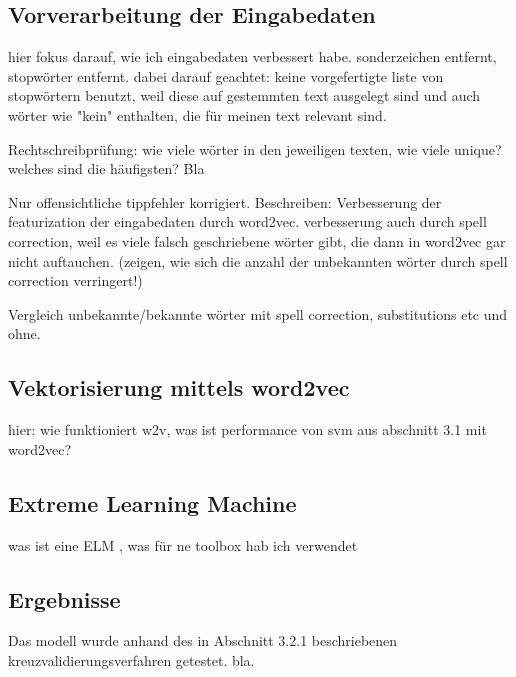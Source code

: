 \subsection{Vorverarbeitung der Eingabedaten}
hier fokus darauf, wie ich eingabedaten verbessert habe. sonderzeichen entfernt, stopwörter entfernt. dabei darauf geachtet: keine vorgefertigte liste von stopwörtern benutzt, weil diese auf gestemmten text ausgelegt sind und auch wörter wie "kein" enthalten, die für meinen text relevant sind.


Rechtschreibprüfung: wie viele wörter in den jeweiligen texten, wie viele unique? welches sind die häufigsten? Bla

Nur offensichtliche tippfehler korrigiert.
Beschreiben: Verbesserung der featurization der eingabedaten durch word2vec. verbesserung auch durch spell correction, weil es viele falsch geschriebene wörter gibt, die dann in word2vec gar nicht auftauchen. (zeigen, wie sich die anzahl der unbekannten wörter durch spell correction verringert!)

Vergleich unbekannte/bekannte wörter mit spell correction, substitutions etc und ohne.

\subsection{Vektorisierung mittels word2vec}
hier: wie funktioniert w2v, was ist performance von svm aus abschnitt 3.1 mit word2vec?

\subsection{Extreme Learning Machine}
was ist eine ELM \citep{huangExtremeLearningMachine2006}, was für ne toolbox hab ich verwendet \citep{akusokHighPerformanceExtremeLearning2015}

\subsection{Ergebnisse}
Das modell wurde anhand des in Abschnitt 3.2.1 beschriebenen kreuzvalidierungsverfahren getestet. bla.